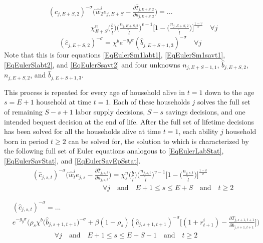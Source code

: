   \begin{equation}\label{EqEulerSlabt2}
    \begin{split}
      &(\hat{c}_{j,E+S,2})^{-\sigma}\Biggl(\hat{w}_2^i e_{j,E+S} - \frac{\partial\hat{T}_{j,E+S,2}}{\partial n_{j,E+S,2}}\Biggr) = ... \\
      &\qquad\qquad\qquad \chi^n_{E+S}\biggl(\frac{b}{\tilde{l}}\biggr)\biggl(\frac{n_{j,E+S,2}}{\tilde{l}}\biggr)^{v-1}\Biggl[1 - \biggl(\frac{n_{j,E+S,2}}{\tilde{l}}\biggr)\Biggr]^{\frac{1-v}{v}} \quad\forall j
    \end{split}
  \end{equation}
  \begin{equation}\label{EqEulerSsavt2}
    (\hat{c}_{j,E+S,2})^{-\sigma} = \chi^b e^{-g_y\sigma}(\hat{b}_{j,E+S+1,3})^{-\sigma} \quad\forall j
  \end{equation}
  Note that this is four equations \eqref{EqEulerSm1labt1}, \eqref{EqEulerSm1savt1}, \eqref{EqEulerSlabt2}, and \eqref{EqEulerSsavt2} and four unknowns $n_{j,E+S-1,1}$, $\hat{b}_{j,E+S,2}$, $n_{j,E+S,2}$, and $\hat{b}_{j,E+S+1,3}$.

  This process is repeated for every age of household alive in $t=1$ down to the age $s=E+1$ household at time $t=1$. Each of these households $j$ solves the full set of remaining $S-s+1$ labor supply decisions, $S-s$ savings decisions, and one intended bequest decision at the end of life. After the full set of lifetime decisions has been solved for all the households alive at time $t=1$, each ability $j$ household born in period $t\geq 2$ can be solved for, the solution to which is characterized by the following full set of Euler equations analogous to \eqref{EqEulerLabStat}, \eqref{EqEulerSavStat}, and \eqref{EqEulerSavEpSstat}.
  \begin{equation}\label{EqEulerslabt}
    \begin{split}
      &(\hat{c}_{j,s,t})^{-\sigma}\Biggl(\hat{w}_t^i e_{j,s} - \frac{\partial\hat{T}_{j,s,t}}{\partial n_{j,s,t}}\Biggr) =  \chi^n_{s}\biggl(\frac{b}{\tilde{l}}\biggr)\biggl(\frac{n_{j,s,t}}{\tilde{l}}\biggr)^{v-1}\Biggl[1 - \biggl(\frac{n_{j,s,t}}{\tilde{l}}\biggr)\Biggr]^{\frac{1-v}{v}} \\
      &\qquad\qquad\qquad\qquad\qquad\forall j \quad\text{and}\quad E+1\leq s\leq E+S\quad\text{and}\quad t\geq 2
    \end{split}
  \end{equation}

  \begin{equation}\label{EqEulersSavt}
    \begin{split}
      &(\hat{c}_{j,s,t})^{-\sigma} = ... \\
      &e^{-g_y\sigma}\Biggl(\rho_{s}\chi^b \bigl(\hat{b}_{j,s+1,t+1}\bigr)^{-\sigma} + \beta(1-\rho_{s})(\hat{c}_{j,s+1,t+1})^{-\sigma}\Biggl[(1 + r_{t+1}^i) - \frac{\partial T_{j,s+1,t+1}}{\partial b_{j,s+1,t+1}}\Biggr]\Biggr) \\
      &\qquad\qquad\qquad\forall j \quad\text{and}\quad E+1\leq s\leq E+S-1 \quad\text{and}\quad t\geq 2
    \end{split}
  \end{equation}

